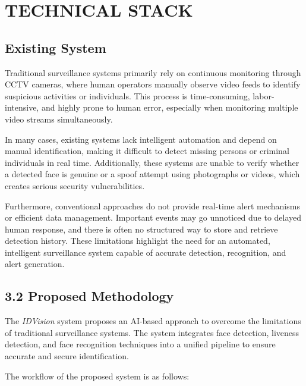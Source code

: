 \documentclass[11pt]{report}
\begin{document}
\chapter{TECHNICAL STACK} 
\section*{Existing System}

Traditional surveillance systems primarily rely on continuous monitoring through CCTV cameras, where human operators manually observe video feeds to identify suspicious activities or individuals. This process is time-consuming, labor-intensive, and highly prone to human error, especially when monitoring multiple video streams simultaneously.

In many cases, existing systems lack intelligent automation and depend on manual identification, making it difficult to detect missing persons or criminal individuals in real time. Additionally, these systems are unable to verify whether a detected face is genuine or a spoof attempt using photographs or videos, which creates serious security vulnerabilities.

Furthermore, conventional approaches do not provide real-time alert mechanisms or efficient data management. Important events may go unnoticed due to delayed human response, and there is often no structured way to store and retrieve detection history. These limitations highlight the need for an automated, intelligent surveillance system capable of accurate detection, recognition, and alert generation.

\section*{3.2 Proposed Methodology}

The \textit{IDVision} system proposes an AI-based approach to overcome the limitations of traditional surveillance systems. The system integrates face detection, liveness detection, and face recognition techniques into a unified pipeline to ensure accurate and secure identification.

The workflow of the proposed system is as follows:
\end{document}

